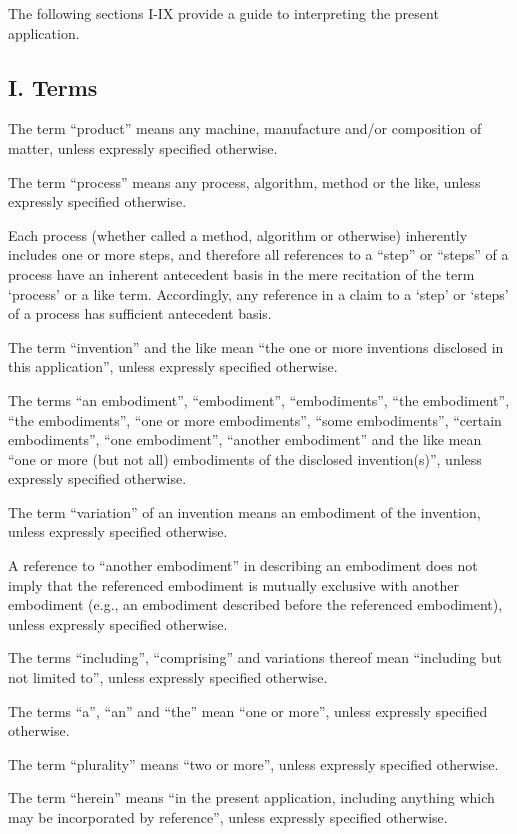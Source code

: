 \documentclass[11pt,a4paper]{article}
\begin{document}
The following sections I-IX provide a guide to interpreting the present application.

\subsection{I. Terms}

The term “product” means any machine, manufacture and/or composition of matter, unless expressly specified otherwise.

The term “process” means any process, algorithm, method or the like, unless expressly specified otherwise.

Each process (whether called a method, algorithm or otherwise) inherently includes one or more steps, and therefore all references to a “step” or “steps” of a process have an inherent antecedent basis in the mere recitation of the term ‘process’ or a like term. Accordingly, any reference in a claim to a ‘step’ or ‘steps’ of a process has sufficient antecedent basis.

The term “invention” and the like mean “the one or more inventions disclosed in this application”, unless expressly specified otherwise.

The terms “an embodiment”, “embodiment”, “embodiments”, “the embodiment”, “the embodiments”, “one or more embodiments”, “some embodiments”, “certain embodiments”, “one embodiment”, “another embodiment” and the like mean “one or more (but not all) embodiments of the disclosed invention(s)”, unless expressly specified otherwise.

The term “variation” of an invention means an embodiment of the invention, unless expressly specified otherwise.

A reference to “another embodiment” in describing an embodiment does not imply that the referenced embodiment is mutually exclusive with another embodiment (e.g., an embodiment described before the referenced embodiment), unless expressly specified otherwise.

The terms “including”, “comprising” and variations thereof mean “including but not limited to”, unless expressly specified otherwise.

The terms “a”, “an” and “the” mean “one or more”, unless expressly specified otherwise.

The term “plurality” means “two or more”, unless expressly specified otherwise.

The term “herein” means “in the present application, including anything which may be incorporated by reference”, unless expressly specified otherwise.
\end{document}
